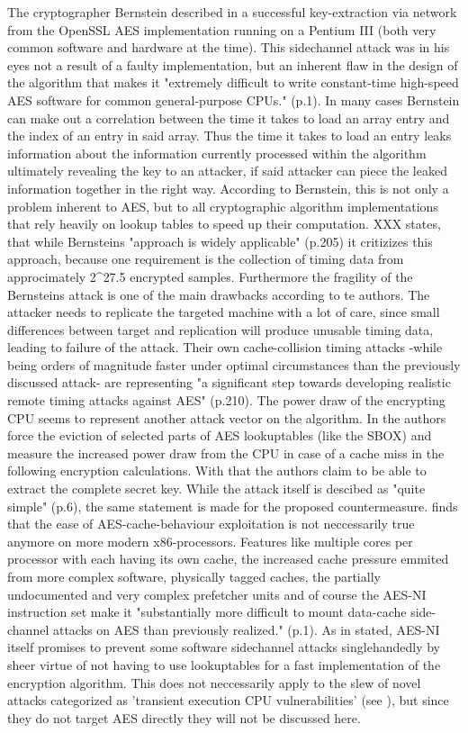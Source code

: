 The cryptographer Bernstein described in \cite{bernsteincache} a successful key-extraction via network from the OpenSSL AES implementation running on a Pentium III (both very common software and hardware at the time). This sidechannel attack was in his eyes not a result of a faulty implementation, but an inherent flaw in the design of the algorithm that makes it "extremely difficult to write constant-time high-speed AES software for common general-purpose CPUs." (p.1). In many cases Bernstein can make out a correlation between the time it takes to load an array entry and the index of an entry in said array. Thus the time it takes to load an entry leaks information about the information currently processed within the algorithm ultimately revealing the key to an attacker, if said attacker can piece the leaked information together in the right way.
According to Bernstein, this is not only a problem inherent to AES, but to all cryptographic algorithm implementations that rely heavily on lookup tables to speed up their computation.
\cite{improvedcache} XXX states, that while Bernsteins "approach is widely applicable" (p.205) it critizizes this approach, because one requirement is the collection of timing data from approcimately 2^{27.5} encrypted samples. Furthermore the fragility of the Bernsteins attack is one of the main drawbacks according to te authors. The attacker needs to replicate the targeted machine with a lot of care, since small differences between target and replication will produce unusable timing data, leading to failure of the attack. Their own cache-collision timing attacks -while being orders of magnitude faster under optimal circumstances than the previously discussed attack- are representing "a significant step towards developing realistic remote timing attacks against AES" (p.210).
The power draw of the encrypting CPU seems to represent another attack vector on the algorithm. In \cite{powerdraw} the authors force the eviction of selected parts of AES lookuptables (like the SBOX) and measure the increased power draw from the CPU in case of a cache miss in the following encryption calculations. With that the authors claim to be able to extract the complete secret key. While the attack itself is descibed as "quite simple" (p.6), the same statement is made for the proposed countermeasure.
\cite{ctattacksfeasible} finds that the ease of AES-cache-behaviour exploitation is not neccessarily true anymore on more modern x86-processors. Features like multiple cores per processor with each having its own cache, the increased cache pressure emmited from more complex software, physically tagged caches, the partially undocumented and very complex prefetcher units and of course the AES-NI instruction set make it "substantially more difficult to mount data-cache side-channel attacks on AES than previously realized." (p.1). As in \cite{aes-ni} stated, AES-NI itself promises to prevent some software sidechannel attacks singlehandedly by sheer virtue of not having to use lookuptables for a fast implementation of the encryption algorithm.
This does not neccessarily apply to the slew of novel attacks categorized as 'transient execution CPU vulnerabilities' (see \cite{transientexecution}), but since they do not target AES directly they will not be discussed here.

